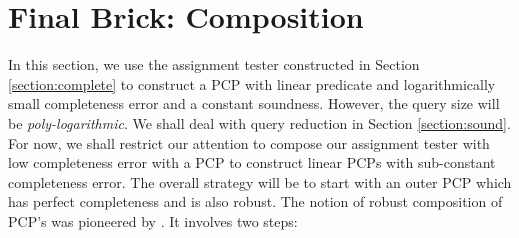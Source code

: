 



\section{Final Brick: Composition}\label{section:composition}
In this section, we use the assignment tester constructed in Section
\ref{section:complete} to construct a PCP with linear predicate and
logarithmically small completeness error and a constant
soundness. However, the query size will be {\em poly-logarithmic}. We shall
deal with query reduction in Section \ref{section:sound}. For now, we
shall restrict our attention to compose our assignment tester with low
completeness error with a PCP to construct linear PCPs with
sub-constant completeness error. The overall strategy will be to start
with an outer PCP which has perfect completeness and is also
robust. The notion of robust composition of PCP's was pioneered by
\cite{BGHSV,DR}. It involves two steps:

